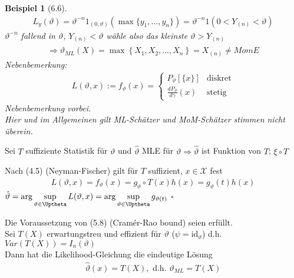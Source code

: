 \documentclass[a4paper,openany]{book}
\theoremstyle{mytheoremstyle}
\newtheorem*{bei}{Beispiel}
\theoremstyle{mytheoremstyle2}
\newtheorem*{cbew}{Beweis}
\newenvironment{bew}[1][]{%
  \ifthenelse{\boolean{showbew}}{%
    \begin{cbew}[#1]%
  }{%
    \expandafter\comment%
  }%
}{%
  \ifthenelse{\boolean{showbew}}{%
    \end{cbew}%
  }{%
    \expandafter\endcomment%
  }%
}
\begin{document}
\begin{bei}[6.6]
  \begin{align*}
    L_y(\vartheta )=\vartheta ^{-n} 1_{(0,\vartheta )}(\max\{y_1,...,y_n\})=\vartheta ^{-n}1(0<Y _{(n)}<\vartheta )
  \end{align*} 
  $\vartheta ^{-n}$ fallend in $\vartheta $, $Y _{(n)}<\vartheta$ wähle also das kleinste $\vartheta > Y _{(n)}$
  \begin{align*}
    \Rightarrow \hat{\vartheta }_{ML}(X)=\max \left\{X_1,X_2,...,X_n \right\}=X _{(n)}\neq MomE
  \end{align*}
  Nebenbemerkung:
  \begin{align*}
    L(\vartheta ,x):=f _{\vartheta }(x)=\begin{cases}
      P _{\vartheta }[\{x\}] &\text{diskret}\\
      \frac{d P _{\vartheta }}{d \gamma }(x) &\text{stetig}
    \end{cases}
  \end{align*}
  Nebenbemerkung vorbei. \\
  Hier und im Allgemeinen gilt ML-Schätzer und MoM-Schätzer stimmen nicht überein.
\end{bei}
\begin{theo}{6.7}{}
  Sei $T$ suffiziente Statistik für $\vartheta $ und $\hat{\vartheta }$ MLE für $\vartheta \Rightarrow \hat{\vartheta }$ ist Funktion von $T$; $\xi \circ T$    
\end{theo}
\begin{bew}[]
  Nach (4.5) (Neyman-Fischer) gilt für $T$ suffizient, $x \in \mathcal{X}$ fest
  \begin{align*}
    L(\vartheta ,x)=f _{\vartheta }(x)=g _{\vartheta }\circ T(x) h(x)=g _{\vartheta }(t)h(x)
  \end{align*}
 $\hat{\vartheta }=\text{arg}\sup\limits _{\vartheta \in \Uptheta}L(\vartheta ,x)=\text{arg}\sup\limits _{\vartheta  \in \Uptheta}g _{\vartheta (t)}$ $\square$ 
\end{bew}
\begin{theo}{6.8}{}
  Die Voraussetzung von (5.8) (Cramér-Rao bound) seien erfüllt. \\
  Sei $T(X)$ erwartungstreu und effizient für $\vartheta $ ($\psi =\text{id}_{\vartheta }$) d.h. $Var(T(X))=I_n(\vartheta )$\\
  Dann hat die Likelihood-Gleichung die eindeutige Lösung 
  \begin{align*}
    \hat{\vartheta }(x)=T(X), \text{ d.h. }\vartheta _{ML}=T(X)
  \end{align*}
\end{theo}
\end{document}
